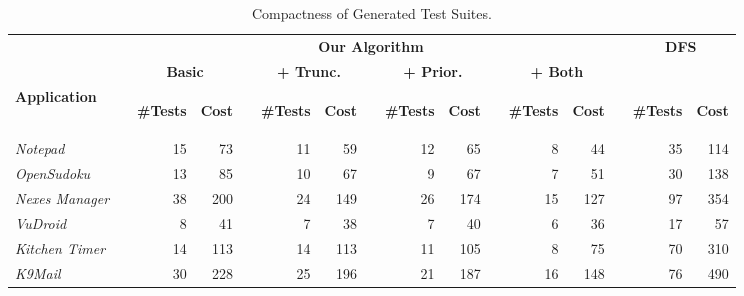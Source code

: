 \begin{table}[t!]
\centering
\caption{Compactness of Generated Test Suites.}
\label{table:algoEffectiveness}
{
\begin{tabular}{@{}lr@{}rrr@{}rrr@{}rrr@{}rrr@{}rr@{}}
\toprule
&&\multicolumn{11}{c}{\bf{Our Algorithm}}
&&\multicolumn{2}{c}{\bf{DFS}}\\
&&\multicolumn{2}{c}{\bf{Basic}}
&&\multicolumn{2}{c}{\bf{+ Trunc.}}
&&\multicolumn{2}{c}{\bf{+ Prior.}}
&&\multicolumn{2}{c}{\bf{+ Both}}
\\
\cmidrule{3-4}
\cmidrule{6-7}
\cmidrule{9-10}
\cmidrule{12-13}
\cmidrule{15-16}
\bf{Application}&&\begin{sideways}\bf{\#Tests}\end{sideways}&\begin{sideways}\bf{Cost}\end{sideways}&&\begin{sideways}\bf{\#Tests}\end{sideways}&\begin{sideways}\bf{Cost}\end{sideways}&&\begin{sideways}\bf{\#Tests}\end{sideways}&\begin{sideways}\bf{Cost}\end{sideways}&&\begin{sideways}\bf{\#Tests}\end{sideways}&\begin{sideways}\bf{Cost}\end{sideways}&&\begin{sideways}\bf{\#Tests}\end{sideways}&\begin{sideways}\bf{Cost}\end{sideways}\\
\midrule
\textit{Notepad}&&15&73&&11&59&&12&65&&8&44&&35&114\\
\textit{OpenSudoku}&&13&85&&10&67&&9&67&&7&51&&30&138\\
\textit{Nexes Manager}&&38&200&&24&149&&26&174&&15&127&&97&354\\
\midrule
\textit{VuDroid}&&8&41&&7&38&&7&40&&6&36&&17&57\\
\textit{Kitchen Timer}&&14&113&&14&113&&11&105&&8&75&&70&310\\
\textit{K9Mail}&&30&228&&25&196&&21&187&&16&148&&76&490\\
\bottomrule
\end{tabular}
}
\end{table}
